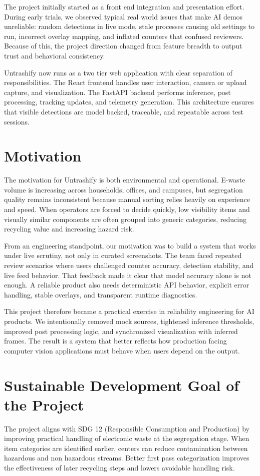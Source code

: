 \documentclass[12pt,a4paper]{report}
\begin{document}
The project initially started as a front end integration and presentation effort. During early trials, we observed typical real world issues that make AI demos unreliable: random detections in live mode, stale processes causing old settings to run, incorrect overlay mapping, and inflated counters that confused reviewers. Because of this, the project direction changed from feature breadth to output trust and behavioral consistency.

Untrashify now runs as a two tier web application with clear separation of responsibilities. The React frontend handles user interaction, camera or upload capture, and visualization. The FastAPI backend performs inference, post processing, tracking updates, and telemetry generation. This architecture ensures that visible detections are model backed, traceable, and repeatable across test sessions.

\section{Motivation}
The motivation for Untrashify is both environmental and operational. E-waste volume is increasing across households, offices, and campuses, but segregation quality remains inconsistent because manual sorting relies heavily on experience and speed. When operators are forced to decide quickly, low visibility items and visually similar components are often grouped into generic categories, reducing recycling value and increasing hazard risk.

From an engineering standpoint, our motivation was to build a system that works under live scrutiny, not only in curated screenshots. The team faced repeated review scenarios where users challenged counter accuracy, detection stability, and live feed behavior. That feedback made it clear that model accuracy alone is not enough. A reliable product also needs deterministic API behavior, explicit error handling, stable overlays, and transparent runtime diagnostics.

This project therefore became a practical exercise in reliability engineering for AI products. We intentionally removed mock sources, tightened inference thresholds, improved post processing logic, and synchronized visualization with inferred frames. The result is a system that better reflects how production facing computer vision applications must behave when users depend on the output.

\section{Sustainable Development Goal of the Project}
The project aligns with SDG 12 (Responsible Consumption and Production) by improving practical handling of electronic waste at the segregation stage. When item categories are identified earlier, centers can reduce contamination between hazardous and non hazardous streams. Better first pass categorization improves the effectiveness of later recycling steps and lowers avoidable handling risk.
\end{document}
